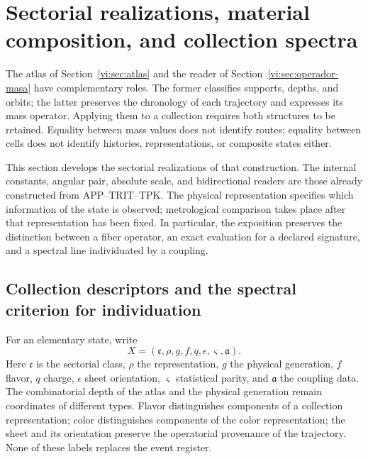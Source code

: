 \section{Sectorial realizations, material composition, and collection spectra}
\label{vi:sec:familias-compuestos}

The atlas of Section~\ref{vi:sec:atlas} and the reader of
Section~\ref{vi:sec:operador-masa} have complementary roles. The former
classifies supports, depths, and orbits; the latter preserves the chronology
of each trajectory and expresses its mass operator. Applying them to a collection
requires both structures to be retained. Equality between mass values does not
identify routes; equality between cells does not identify histories,
representations, or composite states either.

This section develops the sectorial realizations of that construction.
The internal constants, angular pair, absolute scale, and bidirectional readers
are those already constructed from APP--TRIT--TPK. The physical representation
specifies which information of the state is observed; metrological comparison
takes place after that representation has been fixed. In particular, the
exposition preserves the distinction between a fiber operator, an exact evaluation
for a declared signature, and a spectral line individuated by a coupling.

\subsection{Collection descriptors and the spectral criterion for individuation}
\label{vi:subsec:descriptor-familia}

For an elementary state, write
\[
 X=(\mathfrak c,\rho,g,f,q,\epsilon,\varsigma,\mathfrak a).
\]
Here \(\mathfrak c\) is the sectorial class, \(\rho\) the representation,
\(g\) the physical generation, \(f\) flavor, \(q\) charge,
\(\epsilon\) sheet orientation, \(\varsigma\) statistical parity,
and \(\mathfrak a\) the coupling data. The combinatorial depth
of the atlas and the physical generation remain coordinates of different
types. Flavor distinguishes components of a collection representation;
color distinguishes components of the color representation;
the sheet and its orientation preserve the operatorial provenance of the
trajectory. None of these labels replaces the event register.

